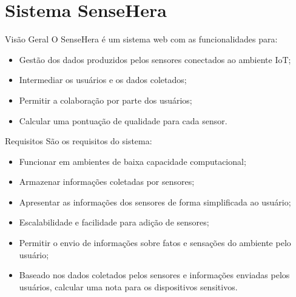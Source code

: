 \documentclass{beamer}
\begin{document}
  \section{Sistema SenseHera}
  \begin{frame}{Visão Geral}
    \quad O SenseHera é um sistema web com as funcionalidades para:
    \begin{itemize}
      \item Gestão dos dados produzidos pelos sensores conectados ao ambiente IoT;
      \item Intermediar os usuários e os dados coletados;
      \item Permitir a colaboração por parte dos usuários;
      \item Calcular uma pontuação de qualidade para cada sensor.
    \end{itemize}
  \end{frame}

  \begin{frame}{Requisitos}
    \quad São os requisitos do sistema:
    \begin{itemize}
      \item Funcionar em ambientes de baixa capacidade computacional;
      \item Armazenar informações coletadas por sensores;
      \item Apresentar as informações dos sensores de forma simplificada ao usuário;
      \item Escalabilidade e facilidade para adição de sensores;
      \item Permitir o envio de informações sobre fatos e sensações do ambiente pelo usuário;
      \item Baseado nos dados coletados pelos sensores e informações enviadas pelos usuários, calcular uma nota para os dispositivos sensitivos.
    \end{itemize}
  \end{frame}
\end{document}
